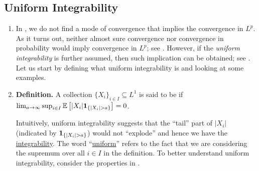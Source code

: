 \subsection{Uniform Integrability}
\label{subsect:uniform-int}
\begin{enumerate}
\item In , we do not find a mode of convergence that
implies the convergence in \(L^p\). As it turns out, neither almost sure
convergence nor convergence in probability would imply convergence in \(L^p\);
see . However, if the \emph{uniform
integrability} is further assumed, then such implication can be obtained; see
. Let us start by defining what uniform
integrability is and looking at some examples.
\item \textbf{Definition.} A collection \(\{X_i\}_{i\in
I}\subseteq L^1\) is said to be  if \(
\lim_{a\to\infty}\sup_{i\in I}\expv{|X_i|\indicset{|X_i|>a}}=0\).

Intuitively, uniform integrability suggests that the ``tail'' part of \(|X_i|\)
(indicated by \(\indicset{|X_i|>a}\)) would not ``explode'' and hence we have
the \underline{integrability}. The word ``\underline{uniform}'' refers to the
fact that we are considering the supremum over all \(i\in I\) in the definition.
To better understand uniform integrability, consider the properties in
.


\end{enumerate}
